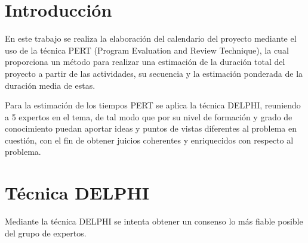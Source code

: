 \documentclass[11pt,a4paper,spanish,twoside]{report}
\begin{document}
\tableofcontents


\chapter*{Introducción}
En este trabajo se realiza la elaboración del calendario del proyecto
mediante el uso de la técnica PERT (Program Evaluation and Review Technique),
la cual proporciona un método para realizar una estimación de la duración
total del proyecto a partir de las actividades, su secuencia y la estimación
ponderada de la duración media de estas. 

Para la estimación de los tiempos PERT se aplica la técnica DELPHI, reuniendo
a 5 expertos en el tema, de tal modo que por su nivel de formación y grado de
conocimiento puedan aportar ideas y puntos de vistas diferentes al problema
en cuestión, con el fin de obtener juicios coherentes y enriquecidos con
respecto al problema. 
\chapter{Técnica DELPHI}
Mediante la técnica DELPHI se intenta obtener un consenso lo más fiable
posible del grupo de expertos.
\end{document}
